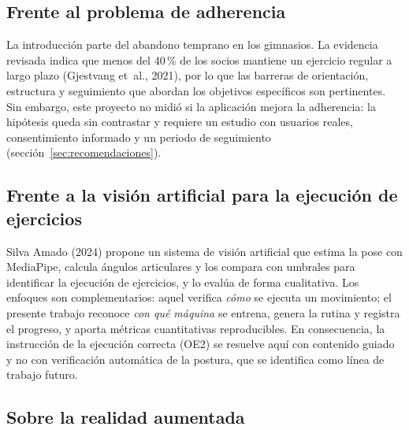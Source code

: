 \subsection{Frente al problema de adherencia}

La introducción parte del abandono temprano en los gimnasios. La evidencia
revisada indica que menos del 40\,\% de los socios mantiene un ejercicio regular
a largo plazo (Gjestvang et~al., 2021), por lo que las barreras de orientación,
estructura y seguimiento que abordan los objetivos específicos son pertinentes.
Sin embargo, este proyecto no midió si la aplicación mejora la adherencia: la
hipótesis queda sin contrastar y requiere un estudio con usuarios reales,
consentimiento informado y un periodo de seguimiento (sección~\ref{sec:recomendaciones}).

\subsection{Frente a la visión artificial para la ejecución de ejercicios}

Silva Amado (2024) propone un sistema de visión artificial que estima la pose
con MediaPipe, calcula ángulos articulares y los compara con umbrales para
identificar la ejecución de ejercicios, y lo evalúa de forma cualitativa. Los
enfoques son complementarios: aquel verifica \emph{cómo} se ejecuta un
movimiento; el presente trabajo reconoce \emph{con qué máquina} se entrena,
genera la rutina y registra el progreso, y aporta métricas cuantitativas
reproducibles. En consecuencia, la instrucción de la ejecución correcta (OE2)
se resuelve aquí con contenido guiado y no con verificación automática de la
postura, que se identifica como línea de trabajo futuro.

\subsection{Sobre la realidad aumentada}

